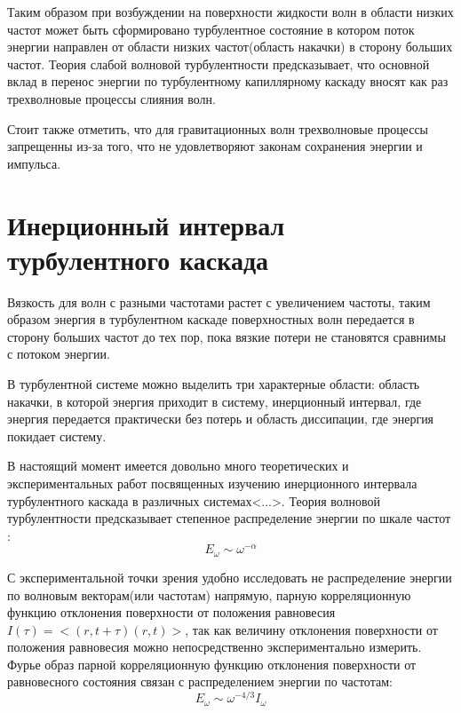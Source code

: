 Таким образом при возбуждении на поверхности жидкости волн в области низких частот может быть сформировано турбулентное состояние в котором поток энергии направлен от области низких частот(область накачки) в сторону больших частот. Теория слабой волновой турбулентности \cite{Zakharov} предсказывает, что основной вклад в перенос энергии по турбулентному капиллярному каскаду вносят как раз трехволновые процессы слияния волн. 

Стоит также отметить, что для гравитационных волн трехволновые процессы запрещенны из-за того, что не удовлетворяют законам сохранения энергии и импульса.

\section{Инерционный интервал турбулентного каскада}%

Вязкость для волн с разными частотами растет с увеличением частоты, таким образом энергия в турбулентном каскаде поверхностных волн передается в сторону больших частот до тех пор, пока вязкие потери не становятся сравнимы с потоком энергии.

В турбулентной системе можно выделить три характерные области: область накачки, в которой энергия приходит в систему, инерционный интервал, где энергия передается практически без потерь и область диссипации, где энергия покидает систему. 

В настоящий момент имеется довольно много теоретических и экспериментальных работ посвященных изучению инерционного интервала турбулентного каскада в различных системах<...>. Теория волновой турбулентности предсказывает степенное распределение энергии по шкале частот \cite{Zakharov}:
\begin{equation}
\label{eq:EOmega}
E_\omega \sim \omega^{-\alpha}
\end{equation}

С экспериментальной точки зрения удобно исследовать не распределение энергии по волновым векторам(или частотам) напрямую, парную корреляционную функцию отклонения поверхности от положения равновесия $I(\tau)=<(r, t+\tau)(r,t)>$, так как величину отклонения поверхности от положения равновесия можно непосредственно экспериментально измерить. Фурье образ парной корреляционную функцию отклонения поверхности от равновесного состояния связан с распределением энергии по частотам:
\begin{equation}
\label{eq:EOmegaI}
E_\omega \sim \omega^{-4/3}I_\omega
\end{equation}

